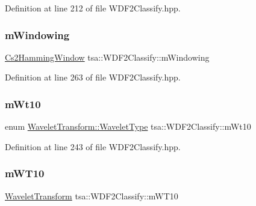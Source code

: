 Definition at line 212 of file W\+D\+F2\+Classify.\+hpp.

\mbox{\label{classtsa_1_1_w_d_f2_classify_a3bc01eda0b34064bfc9157a1ff708391}} 
\subsubsection{\texorpdfstring{m\+Windowing}{mWindowing}}
{\footnotesize\ttfamily \hyperlink{classtsa_1_1_cs2_hamming_window}{Cs2\+Hamming\+Window} tsa\+::\+W\+D\+F2\+Classify\+::m\+Windowing\hspace{0.3cm}{\ttfamily [private]}}



Definition at line 263 of file W\+D\+F2\+Classify.\+hpp.

\mbox{\label{classtsa_1_1_w_d_f2_classify_a17b190834294293f935a8ff2baf96a2f}} 
\subsubsection{\texorpdfstring{m\+Wt10}{mWt10}}
{\footnotesize\ttfamily enum \hyperlink{classtsa_1_1_wavelet_transform_a5a529de70e0004333fcf23b9cca88ce7}{Wavelet\+Transform\+::\+Wavelet\+Type} tsa\+::\+W\+D\+F2\+Classify\+::m\+Wt10\hspace{0.3cm}{\ttfamily [private]}}



Definition at line 243 of file W\+D\+F2\+Classify.\+hpp.

\mbox{\label{classtsa_1_1_w_d_f2_classify_a76e2e8df164b04fd2cfdde2b7c757d8b}} 
\subsubsection{\texorpdfstring{m\+W\+T10}{mWT10}}
{\footnotesize\ttfamily \hyperlink{classtsa_1_1_wavelet_transform}{Wavelet\+Transform} tsa\+::\+W\+D\+F2\+Classify\+::m\+W\+T10\hspace{0.3cm}{\ttfamily [private]}}




